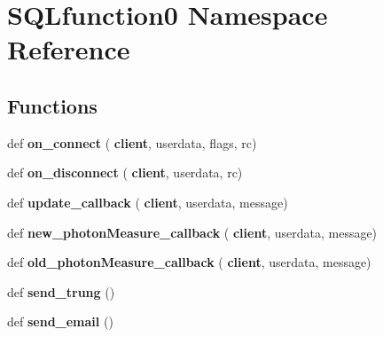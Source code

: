 \section{S\+Q\+Lfunction0 Namespace Reference}
\label{namespace_s_q_lfunction0}
\subsection*{Functions}
\begin{DoxyCompactItemize}
\item 
def \textbf{ on\+\_\+connect} (\textbf{ client}, userdata, flags, rc)
\item 
def \textbf{ on\+\_\+disconnect} (\textbf{ client}, userdata, rc)
\item 
def \textbf{ update\+\_\+callback} (\textbf{ client}, userdata, message)
\item 
def \textbf{ new\+\_\+photon\+Measure\+\_\+callback} (\textbf{ client}, userdata, message)
\item 
def \textbf{ old\+\_\+photon\+Measure\+\_\+callback} (\textbf{ client}, userdata, message)
\item 
def \textbf{ send\+\_\+trung} ()
\item 
def \textbf{ send\+\_\+email} ()
\end{DoxyCompactItemize}
